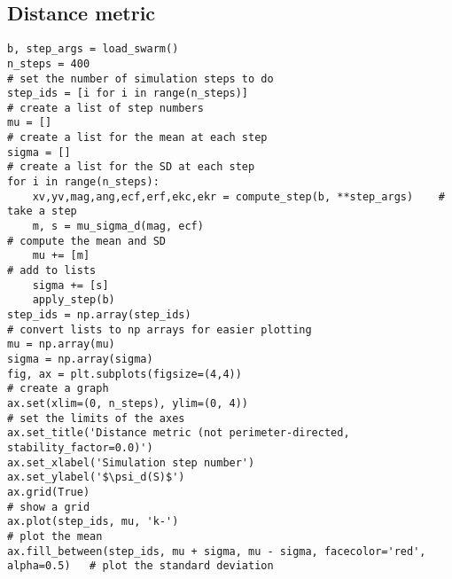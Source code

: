 \documentclass{article}
\begin{document}
\subsection{Distance metric}
\begin{verbatim}
b, step_args = load_swarm()
n_steps = 400                                                               # set the number of simulation steps to do
step_ids = [i for i in range(n_steps)]                                      # create a list of step numbers
mu = []                                                                     # create a list for the mean at each step 
sigma = []                                                                  # create a list for the SD at each step
for i in range(n_steps):
    xv,yv,mag,ang,ecf,erf,ekc,ekr = compute_step(b, **step_args)    # take a step
    m, s = mu_sigma_d(mag, ecf)                                             # compute the mean and SD
    mu += [m]                                                               # add to lists
    sigma += [s]
    apply_step(b)
step_ids = np.array(step_ids)                                               # convert lists to np arrays for easier plotting
mu = np.array(mu)
sigma = np.array(sigma)
fig, ax = plt.subplots(figsize=(4,4))                                       # create a graph
ax.set(xlim=(0, n_steps), ylim=(0, 4))                                   # set the limits of the axes
ax.set_title('Distance metric (not perimeter-directed, stability_factor=0.0)')
ax.set_xlabel('Simulation step number')
ax.set_ylabel('$\psi_d(S)$')
ax.grid(True)                                                               # show a grid
ax.plot(step_ids, mu, 'k-')                                                 # plot the mean
ax.fill_between(step_ids, mu + sigma, mu - sigma, facecolor='red', alpha=0.5)   # plot the standard deviation
\end{verbatim}
\end{document}
